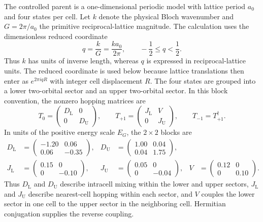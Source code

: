 \documentclass[11pt]{article}
\begin{document}
The controlled parent is a one-dimensional periodic model with lattice period $a_0$ and
four states per cell. Let $k$ denote the physical Bloch wavenumber and
$G=2\pi/a_0$ the primitive reciprocal-lattice magnitude. The calculation uses the
dimensionless reduced coordinate
\begin{equation}
 q=\frac{k}{G}=\frac{k a_0}{2\pi},
 \qquad -\frac12\le q<\frac12.
 \label{eq:reduced-wavenumber}
\end{equation}
Thus $k$ has units of inverse length, whereas $q$ is expressed in reciprocal-lattice
units. The reduced coordinate is used below because lattice translations then enter as
$e^{2\pi iqR}$ with integer cell displacement $R$. The four states are grouped into a
lower two-orbital sector and an upper two-orbital sector. In
this block convention, the nonzero hopping matrices are
\begin{equation}
 T_0=
 \begin{pmatrix}
 D_{\mathrm L}&0\\
 0&D_{\mathrm U}
 \end{pmatrix},
 \qquad
 T_{+1}=
 \begin{pmatrix}
 J_{\mathrm L}&V\\
 0&J_{\mathrm U}
 \end{pmatrix},
 \qquad
 T_{-1}=T_{+1}^\dagger.
 \label{eq:parent-hopping-blocks}
\end{equation}
In units of the positive energy scale $E_G$, the $2\times2$ blocks are
\begin{align}
 D_{\mathrm L}&=
 \begin{pmatrix}-1.20&0.06\\0.06&-0.35\end{pmatrix},
 &
 D_{\mathrm U}&=
 \begin{pmatrix}1.00&0.04\\0.04&1.75\end{pmatrix},\\
 J_{\mathrm L}&=
 \begin{pmatrix}0.15&0\\0&-0.10\end{pmatrix},
 &
 J_{\mathrm U}&=
 \begin{pmatrix}0.05&0\\0&-0.04\end{pmatrix},
 &
 V&=
 \begin{pmatrix}0.12&0\\0&0.10\end{pmatrix}.
 \label{eq:parent-numerical-blocks}
\end{align}
Thus $D_{\mathrm L}$ and $D_{\mathrm U}$ describe intracell mixing within the lower and
upper sectors, $J_{\mathrm L}$ and $J_{\mathrm U}$ describe nearest-cell hopping within
each sector, and $V$ couples the lower sector in one cell to the upper sector in the
neighboring cell. Hermitian conjugation supplies the reverse coupling.
\end{document}
